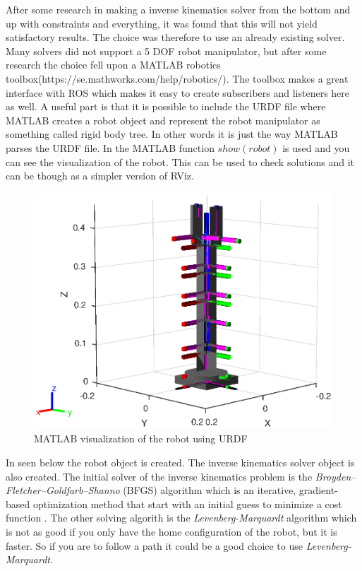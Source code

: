 After some research in making a inverse kinematics solver from the bottom and up with constraints and everything, it was found that this will not yield satisfactory results. The choice was therefore to use an already existing solver. Many solvers did not support a 5 DOF robot manipulator, but after some research the choice fell upon a MATLAB robotics toolbox(https://se.mathworks.com/help/robotics/). The toolbox makes a great interface with ROS which makes it easy to create subscribers and listeners here as well. A useful part is that it is possible to include the URDF file where MATLAB creates a robot object and represent the robot manipulator as something called rigid body tree. In other words it is just the way MATLAB parses the URDF file. In  the MATLAB function $show(robot)$ is used and you can see the visualization of the robot. This can be used to check solutions and it can be though as a simpler version of RViz.  

\begin{figure}[htbp]
  \centering
  \includegraphics[width=.9\textwidth]{img/showRobs.eps}
  \caption{MATLAB visualization of the robot using URDF}
  \label{fig:showRovs}
\end{figure}

In  seen below the robot object is created. The inverse kinematics solver object is also created. The initial solver of the inverse kinematics problem is the \textit{Broyden–Fletcher–Goldfarb–Shanno} (BFGS) algorithm which is an iterative, gradient-based optimization method that start with an initial guess to minimize a cost function \cite{MatlabRobTool}. The other solving algorith is the \textit{Levenberg-Marquardt} algorithm which is not as good if you only have the home configuration of the robot, but it is faster. So if you are to follow a path it could be a good choice to use \textit{Levenberg-Marquardt}. 

